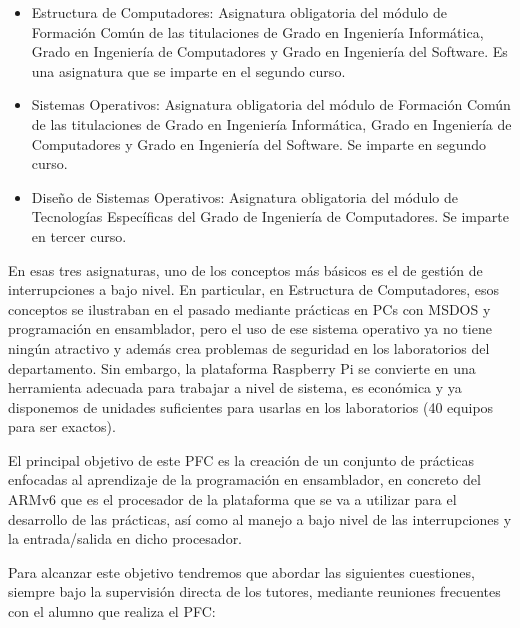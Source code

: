 \begin{sinopsis}
\begin{itemize}
  \item{Estructura de Computadores:} Asignatura obligatoria del módulo de Formación
        Común de las titulaciones de Grado en Ingeniería Informática, Grado en
        Ingeniería de Computadores y Grado en Ingeniería del Software. Es una asignatura
        que se imparte en el segundo curso.
  \item{Sistemas Operativos:} Asignatura obligatoria del módulo de Formación Común de las
        titulaciones de Grado en Ingeniería Informática, Grado en Ingeniería de
        Computadores y Grado en Ingeniería del Software. Se imparte en segundo curso.
  \item{Diseño de Sistemas Operativos:} Asignatura obligatoria del módulo de Tecnologías
        Específicas del Grado de Ingeniería de Computadores. Se imparte en tercer curso.
\end{itemize}

En esas tres asignaturas, uno de los conceptos más básicos es el de gestión de
interrupciones a bajo nivel. En particular, en Estructura de Computadores, esos
conceptos se ilustraban en el pasado mediante prácticas en PCs con MSDOS y programación
en ensamblador, pero el uso de ese sistema operativo ya no tiene ningún atractivo y
además crea problemas de seguridad en los laboratorios del departamento. Sin embargo,
la plataforma Raspberry Pi se convierte en una herramienta adecuada para trabajar a
nivel de sistema, es económica y ya disponemos de unidades suficientes para usarlas
en los laboratorios (40 equipos para ser exactos).
\end{sinopsis}
 
\label{sec:intro:obj}
El principal objetivo de este PFC es la creación de un conjunto de prácticas enfocadas
al aprendizaje de la programación en ensamblador, en concreto del ARMv6 que es el
procesador de la plataforma que se va a utilizar para el desarrollo de las prácticas,
así como al manejo a bajo nivel de las interrupciones y la entrada/salida en dicho procesador.

Para alcanzar este objetivo tendremos que abordar las siguientes cuestiones, siempre
bajo la supervisión directa de los tutores, mediante reuniones frecuentes con el alumno
que realiza el PFC:

